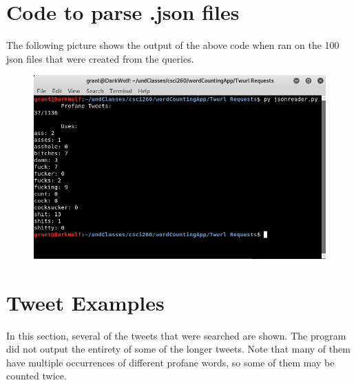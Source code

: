 \documentclass{article}
\begin{document}
\section{Code to parse .json files}

The following picture shows the output of the above code when ran on the 100 json files that were created from the queries.

\begin{figure}[h]
	\includegraphics[scale=2.59]{terminal}
\end{figure}

\section{Tweet Examples}
\tab In this section, several of the tweets that were searched are shown. The program did not output the entirety of some of the longer tweets. Note that many of them have multiple occurrences of different profane words, so some of them may be counted twice.\newline
\end{document}
